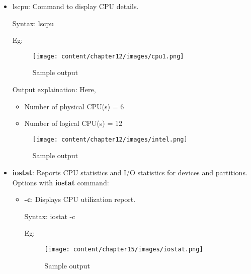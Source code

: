 \setlength{\columnsep}{3pt}
\begin{flushleft}
\begin{itemize}
	\item lscpu: Command to display CPU details.
	\begin{tcolorbox}[breakable,notitle,boxrule=-0pt,colback=pink,colframe=pink]
		\color{black}
		\font=9pt
		Syntax: lscpu
		\font=4pt
	\end{tcolorbox}
	Eg:
	\begin{figure}[h!]
		\centering
		\texttt{[image: content/chapter12/images/cpu1.png]}
		\caption{Sample output}
		\label{fig:cpu1}
	\end{figure}
	
	Output explaination: Here,
	\begin{itemize}
		\item Number of physical CPU(s) = 6
		\item Number of logical CPU(s) = 12
	\end{itemize}	
	
	\begin{figure}[h!]
		\centering
		\texttt{[image: content/chapter12/images/intel.png]}
		\caption{Sample output}
		\label{fig:cpu1}
	\end{figure}
	\newpage
	
	\item \textbf{iostat}: Reports CPU statistics and I/O statistics for devices and partitions.
	\newline
	Options with \textbf{iostat} command:
	\begin{itemize}
		\item \textbf{-c}: Displays CPU utilization report.
		\bigskip
		\begin{tcolorbox}[breakable,notitle,boxrule=0pt,colback=pink,colframe=pink]
			\color{black}
			\font=9pt
			Syntax: iostat -c
			\font=4pt
		\end{tcolorbox}
		Eg:
		\begin{figure}[h!]
			\centering
			\texttt{[image: content/chapter15/images/iostat.png]}
			\caption{Sample output}
			\label{fig:output}
		\end{figure}
		

\end{itemize}
\end{itemize}
\end{flushleft}
